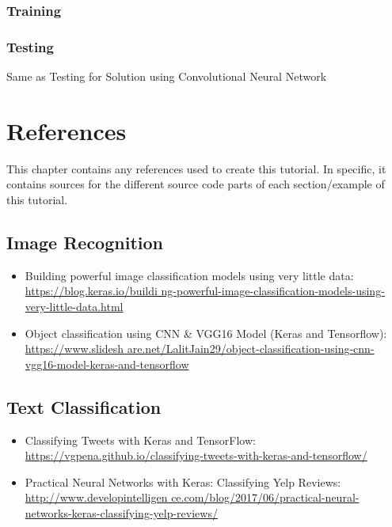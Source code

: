 \documentclass[10pt,twoside,a4paper,openany]{memoir}
\renewcommand*{\printchaptertitle}[1]{\vspace{-2.5cm}\chaptitlefont\thechapter.\ ##1\vspace{-1cm}}
\begin{document}
\subsection{Training}


\subsection{Testing}
Same as Testing for Solution using Convolutional Neural Network

\backmatter

\renewcommand*{\printchaptertitle}[1]{\chaptitlefont#1}
\chapter*{References}
This chapter contains any references used to create this tutorial.
In specific, it contains sources for the different source
code parts of each section/example of this tutorial.

\section{Image Recognition}
\begin{itemize}
\item Building powerful image classification models using very little data: \href{https://blog.keras.io/building-powerful-image-classification-models-using-very-little-data.html}{https://blog.keras.io/buildi ng-powerful-image-classification-models-using-very-little-data.html}
\item Object classification using CNN \& VGG16 Model (Keras and Tensorflow): \href{https://www.slideshare.net/LalitJain29/object-classification-using-cnn-vgg16-model-keras-and-tensorflow}{https://www.slidesh are.net/LalitJain29/object-classification-using-cnn-vgg16-model-keras-and-tensorflow}
\end{itemize}

\section{Text Classification}
\begin{itemize}
\item Classifying Tweets with Keras and TensorFlow: \href{https://vgpena.github.io/classifying-tweets-with-keras-and-tensorflow/}{https://vgpena.github.io/classifying-tweets-with-keras-and-tensorflow/}
\item Practical Neural Networks with Keras: Classifying Yelp Reviews: \href{http://www.developintelligence.com/blog/2017/06/practical-neural-networks-keras-classifying-yelp-reviews/}{http://www.developintelligen ce.com/blog/2017/06/practical-neural-networks-keras-classifying-yelp-reviews/}
\end{itemize}
\end{document}
